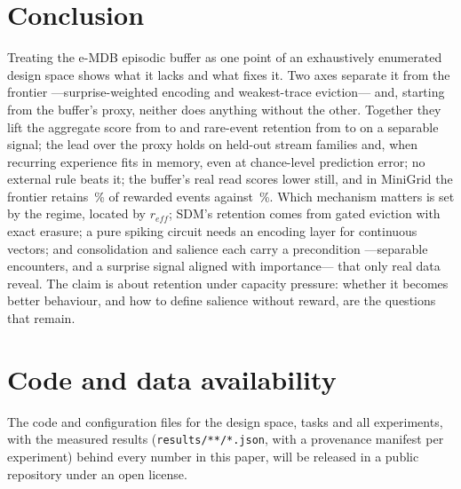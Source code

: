 \documentclass[conference]{IEEEtran}
\begin{document}
\section{Conclusion}

Treating the e-MDB episodic buffer as one point of an exhaustively enumerated
design space shows what it lacks and what fixes it. Two axes separate it from
the frontier ---surprise-weighted encoding and weakest-trace eviction--- and,
starting from the buffer's proxy, neither does anything without the other.
Together they lift the aggregate score
from  to
 and rare-event retention from
 to
 on a separable
signal; the lead over the proxy holds on held-out stream families and, when
recurring experience fits in memory, even at chance-level prediction error; no external
rule beats it; the buffer's real read scores
lower still, and in MiniGrid the frontier retains
\,\%
of rewarded events against
\,\%.
Which mechanism matters is set by the regime, located by $r_{eff}$; SDM's
retention comes from gated eviction with exact erasure; a pure spiking circuit
needs an encoding layer for continuous vectors; and consolidation and salience
each carry a precondition ---separable encounters, and a surprise signal
aligned with importance--- that only real data reveal. The claim is about
retention under capacity pressure: whether it becomes better behaviour, and
how to define salience without reward, are the questions that remain.

\section*{Code and data availability}

The code and configuration files for the design space, tasks and all
experiments, with the measured results (\texttt{results/**/*.json}, with a
provenance manifest per experiment) behind every number in this paper, will be
released in a public repository under an open license.



\end{document}
